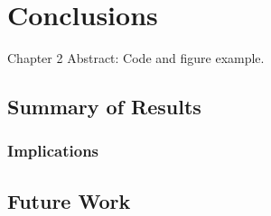 \chapter{Conclusions}
\begin{chapterabstract}
    Chapter 2 Abstract: Code and figure example.
\end{chapterabstract}




\section{Summary of Results}

\subsection{Implications}


\section{Future Work}
